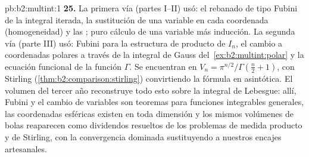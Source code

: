 \begin{solution}{pb:b2:multint:1}
\textbf{25.} La primera vía (partes I--II) usó: el rebanado de tipo
Fubini de la integral iterada, la sustitución de una variable en cada
coordenada (homogeneidad) y las ; puro cálculo
de una variable más inducción. La segunda vía (parte III) usó: Fubini
para la estructura de producto de $I_n$, el cambio a coordenadas
polares a través de la integral de Gauss del~\cref{ex:b2:multint:polar} y la ecuación funcional de la función
$\Gamma$. Se encuentran en $V_n = \pi^{n/2}/\Gamma(\frac n2 + 1)$,
con Stirling (\cref{thm:b2:comparison:stirling}) convirtiendo la
fórmula en asintótica. El volumen del tercer año reconstruye todo
esto sobre la integral de Lebesgue: allí, Fubini y el cambio de
variables son teoremas para funciones integrables generales, las
coordenadas esféricas existen en toda dimensión y los mismos
volúmenes de bolas reaparecen como dividendos resueltos de los
problemas de medida producto y de Stirling, con la convergencia
dominada sustituyendo a nuestros encajes artesanales.
\end{solution}
